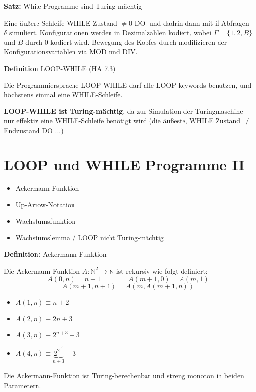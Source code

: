 \documentclass[a4paper,graphics,11pt]{article}
\begin{document}
\strut

\textbf{Satz:} While-Programme sind Turing-mächtig

Eine äußere Schleife WHILE Zustand $\neq 0$ DO, und dadrin dann mit if-Abfragen $\delta$ simuliert.
Konfigurationen werden in Dezimalzahlen kodiert, wobei $\Gamma = \{1,2,B\}$ und $B$ durch 0 kodiert wird.
Bewegung des Kopfes durch modifizieren der Konfigurationsvariablen via MOD und DIV.

\strut

\textbf{Definition} LOOP-WHILE (HA 7.3)

Die Programmiersprache LOOP-WHILE darf alle LOOP-keywords benutzen, und höchstens einmal
eine WHILE-Schleife.

\textbf{LOOP-WHILE ist Turing-mächtig}, da zur Simulation der Turingmaschine nur effektiv eine WHILE-Schleife
benötigt wird (die äußeste, WHILE Zustand $\neq$ Endzustand DO ...)



\newpage



\section{LOOP und WHILE Programme II}

\begin{itemize}
    \item Ackermann-Funktion
    \item Up-Arrow-Notation
    \item Wachstumsfunktion
    \item Wachstumslemma / LOOP nicht Turing-mächtig
\end{itemize}

\textbf{Definition:} Ackermann-Funktion

Die Ackermann-Funktion $A : \mathbb{N}^2 \to \mathbb{N}$ ist rekursiv wie folgt definiert:
$$
    A(0,n) = n+1
    \qquad\qquad
    A(m+1,0) = A(m,1)
$$$$
    A(m+1,n+1) = A(m, A(m+1,n))
$$
\begin{itemize}
    \item $A(1,n) \equiv n+2$
    \item $A(2,n) \equiv 2n+3$
    \item $A(3,n) \equiv 2^{n+3}-3$
    \item $A(4,n) \equiv \underbrace{2^{2^{.^{.^{.^2}}}}}_{n+3} - 3$
\end{itemize}

Die Ackermann-Funktion ist Turing-berechenbar und streng monoton in beiden Parametern.
\end{document}
